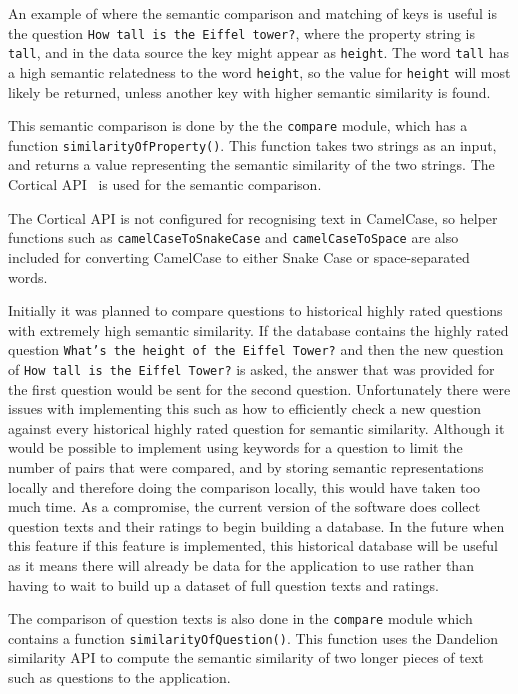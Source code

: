 \documentclass[authoryearcitations]{UoYCSproject}
\begin{document}
An example of where the semantic comparison and matching of keys is useful is the question \texttt{How tall is the Eiffel tower?}, where the property string is \texttt{tall}, and in the data source the key might appear as \texttt{height}. The word \texttt{tall} has a high semantic relatedness to the word \texttt{height}, so the value for \texttt{height} will most likely be returned, unless another key with higher semantic similarity is found.

This semantic comparison is done by the the \texttt{compare} module, which has a function \texttt{similarityOfProperty()}. This function takes two strings as an input, and returns a value representing the semantic similarity of the two strings. The Cortical API~\cite{serviceCorticalSim} is used for the semantic comparison. 

The Cortical API is not configured for recognising text in CamelCase, so helper functions such as \texttt{camelCaseToSnakeCase} and \texttt{camelCaseToSpace} are also included for converting CamelCase to either Snake Case or space-separated words.

Initially it was planned to compare questions to historical highly rated questions with extremely high semantic similarity. If the database contains the highly rated question \texttt{What's the height of the Eiffel Tower?} and then the new question of \texttt{How tall is the Eiffel Tower?} is asked, the answer that was provided for the first question would be sent for the second question. Unfortunately there were issues with implementing this such as how to efficiently check a new question against every historical highly rated question for semantic similarity. Although it would be possible to implement using keywords for a question to limit the number of pairs that were compared, and by storing semantic representations locally and therefore doing the comparison locally, this would have taken too much time. As a compromise, the current version of the software does collect question texts and their ratings to begin building a database. In the future when this feature if this feature is implemented, this historical database will be useful as it means there will already be data for the application to use rather than having to wait to build up a dataset of full question texts and ratings.

The comparison of question texts is also done in the \texttt{compare} module which contains a function \texttt{similarityOfQuestion()}. This function uses the Dandelion~\cite{serviceDandelionSim} similarity API to compute the semantic similarity of two longer pieces of text such as questions to the application.
\end{document}
